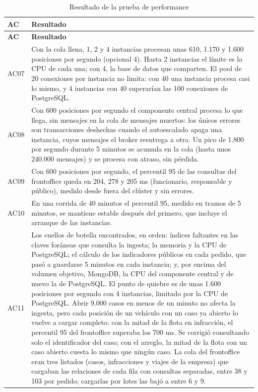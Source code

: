 \begin{longtable}{|p{}|p{}|}
    \caption{Resultado de la prueba de performance}\label{tab:resultado-performance}\\
    \hline
    \textbf{AC} & \textbf{Resultado} \\
    \hline
    \endfirsthead
    \hline
    \textbf{AC} & \textbf{Resultado} \\
    \hline
    \endhead
    AC07 & Con la cola llena, 1, 2 y 4 instancias procesan unas 610, 1.170 y 1.600 posiciones por segundo (opcional 4). Hasta 2 instancias el límite es la CPU de cada una; con 4, la base de datos que comparten. El pool de 20 conexiones por instancia no limita: con 40 una instancia procesa casi lo mismo, y 4 instancias con 40 superarían las 100 conexiones de PostgreSQL. \\
    \hline
    AC08 & Con 600 posiciones por segundo el componente central procesa lo que llega, sin mensajes en la cola de mensajes muertos: los únicos errores son transacciones deshechas cuando el autoescalado apaga una instancia, cuyos mensajes el broker reentrega a otra. Un pico de 1.800 por segundo durante 5 minutos se acumula en la cola (hasta unos 240.000 mensajes) y se procesa con atraso, sin pérdida. \\
    \hline
    AC09 & Con 600 posiciones por segundo, el percentil 95 de las consultas del frontoffice queda en 204, 278 y 205 ms (funcionario, responsable y público), medido desde fuera del clúster y sin errores. \\
    \hline
    AC10 & En una corrida de 40 minutos el percentil 95, medido en tramos de 5 minutos, se mantiene estable después del primero, que incluye el arranque de las instancias. \\
    \hline
    AC11 & Los cuellos de botella encontrados, en orden: índices faltantes en las claves foráneas que consulta la ingesta; la memoria y la CPU de PostgreSQL; el cálculo de los indicadores públicos en cada pedido, que pasó a guardarse 5 minutos en cada instancia; y, por encima del volumen objetivo, MongoDB, la CPU del componente central y de nuevo la de PostgreSQL. El punto de quiebre es de unas 1.600 posiciones por segundo con 4 instancias, limitado por la CPU de PostgreSQL. Abrir 9.000 casos en menos de un minuto no afecta la ingesta, pero cada posición de un vehículo con un caso ya abierto lo vuelve a cargar completo: con la mitad de la flota en infracción, el percentil 95 del frontoffice superaba los 700 ms. Se corrigió consultando solo el identificador del caso; con el arreglo, la mitad de la flota con un caso abierto cuesta lo mismo que ningún caso. La cola del frontoffice eran tres listados (casos, infracciones y viajes de la empresa) que cargaban las relaciones de cada fila con consultas separadas, entre 38 y 103 por pedido; cargarlas por lotes las bajó a entre 6 y 9. \\

\end{longtable}
